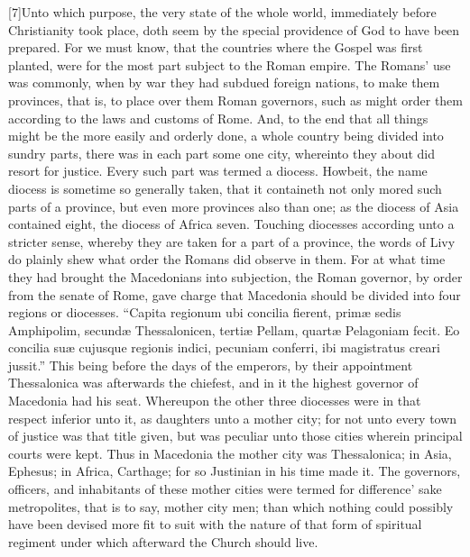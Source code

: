 [7]Unto which purpose, the very state of the whole world, immediately before Christianity took place, doth seem by the special providence of God to have been prepared. For we must know, that the countries where the Gospel was first planted, were for the most part subject to the Roman empire. The Romans’ use was commonly, when by war they had subdued foreign nations, to make them provinces, that is, to place over them Roman governors, such as might order them according to the laws and customs of Rome. And, to the end that all things might be the more easily and orderly done, a whole country being divided into sundry parts, there was in each part some one city, whereinto they about did resort for justice. Every such part was termed a diocess. Howbeit, the name diocess is sometime so generally taken, that it containeth  not only mored such parts of a province,
 but even more provinces also than one; as the diocess of Asia contained eight, the diocess of Africa seven. Touching diocesses according unto a stricter sense, whereby they are taken for a part of a province, the words of Livy do plainly shew what order the Romans did observe in them. For at what time they had brought the Macedonians into subjection, the Roman governor, by order from the senate of Rome, gave charge that Macedonia should be divided into four regions or diocesses. “Capita regionum ubi concilia fierent, primæ sedis Amphipolim, secundæ Thessalonicen, tertiæ Pellam, quartæ Pelagoniam fecit. Eo concilia suæ cujusque regionis indici, pecuniam conferri, ibi magistratus creari jussit.” This being before the days of the emperors, by their appointment Thessalonica was afterwards the chiefest, and in it the highest governor of Macedonia had his seat. Whereupon the other three diocesses were in that respect inferior unto it, as daughters unto a mother city; for not unto every town of justice was that title given, but was peculiar unto those cities wherein principal courts were kept. Thus in Macedonia the mother city was Thessalonica; in Asia, Ephesus; in Africa, Carthage; for so Justinian in his time made it. The governors, officers, and inhabitants of these mother cities were termed for difference’ sake metropolites, that is to say, mother city men; than which nothing could possibly have been devised more fit to suit with the nature of that form of spiritual regiment under which afterward the Church should live.

